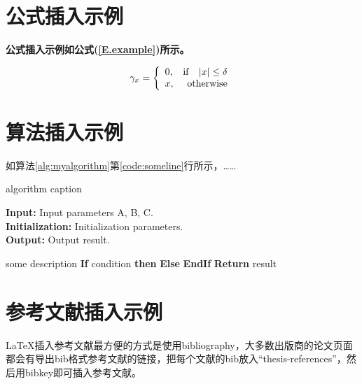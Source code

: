 \lipsum

\newpage

\section{公式插入示例}

\lipsum

\textbf{公式插入示例如公式(\ref{E.example})所示。}

\begin{equation}
\gamma_{x}=
\left\{
  \begin{array}{lr}
  0, & {\rm if}~~\;|x| \leq \delta \\
  x, & {\rm otherwise}
  \end{array}
\right.
\label{E.example}
\end{equation}


\newpage

\section{算法插入示例}

如算法\ref{alg:myalgorithm}第\ref{code:someline}行所示，……
\begin{algorithm}
\caption{algorithm caption} %
\hspace*{0.02in} \textbf{Input:} Input parameters A, B, C.\\
\hspace*{0.02in} \textbf{Initialization:} Initialization parameters.\\
\hspace*{0.02in} \textbf{Output:} Output result.
\begin{algorithmic}[1]
	\State some description %
	\State \textbf{If} {condition} \textbf{then}
	\label{code:someline}  
	 	\State {}
	\State \textbf{Else}
	 	\State {}
	 	\State {}
	\State \textbf{EndIf}
	\State \textbf{Return} {result}
\end{algorithmic}
\label{alg:myalgorithm}
\end{algorithm}

\newpage

\section{参考文献插入示例}

LaTeX\cite{lamport1994latex}插入参考文献最方便的方式是使用bibliography\cite{pritchard1969statistical}，大多数出版商的论文页面都会有导出bib格式参考文献的链接，把每个文献的bib放入``thesis-references''，然后用bibkey即可插入参考文献。

